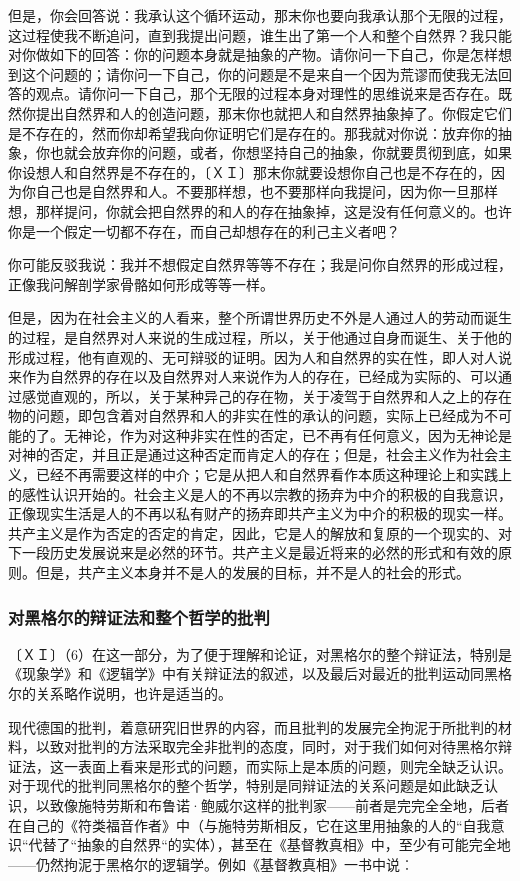 \documentclass[a4paper,twoside,12pt]{ctexart}
\begin{document}
但是，你会回答说：我承认这个循环运动，那末你也要向我承认那个无限的过程，这过程使我不断追问，直到我提出问题，谁生出了第一个人和整个自然界？我只能对你做如下的回答：你的问题本身就是抽象的产物。请你问一下自己，你是怎样想到这个问题的；请你问一下自己，你的问题是不是来自一个因为荒谬而使我无法回答的观点。请你问一下自己，那个无限的过程本身对理性的思维说来是否存在。既然你提出自然界和人的创造问题，那末你也就把人和自然界抽象掉了。你假定它们是不存在的，然而你却希望我向你证明它们是存在的。那我就对你说：放弃你的抽象，你也就会放弃你的问题，或者，你想坚持自己的抽象，你就要贯彻到底，如果你设想人和自然界是不存在的，〔ＸＩ〕那末你就要设想你自己也是不存在的，因为你自己也是自然界和人。不要那样想，也不要那样向我提问，因为你一旦那样想，那样提问，你就会把自然界的和人的存在抽象掉，这是没有任何意义的。也许你是一个假定一切都不存在，而自己却想存在的利己主义者吧？

你可能反驳我说：我并不想假定自然界等等不存在；我是问你自然界的形成过程，正像我问解剖学家骨骼如何形成等等一样。

但是，因为在社会主义的人看来，整个所谓世界历史不外是人通过人的劳动而诞生的过程，是自然界对人来说的生成过程，所以，关于他通过自身而诞生、关于他的形成过程，他有直观的、无可辩驳的证明。因为人和自然界的实在性，即人对人说来作为自然界的存在以及自然界对人来说作为人的存在，已经成为实际的、可以通过感觉直观的，所以，关于某种异己的存在物，关于凌驾于自然界和人之上的存在物的问题，即包含着对自然界和人的非实在性的承认的问题，实际上已经成为不可能的了。无神论，作为对这种非实在性的否定，已不再有任何意义，因为无神论是对神的否定，并且正是通过这种否定而肯定人的存在；但是，社会主义作为社会主义，已经不再需要这样的中介；它是从把人和自然界看作本质这种理论上和实践上的感性认识开始的。社会主义是人的不再以宗教的扬弃为中介的积极的自我意识，正像现实生活是人的不再以私有财产的扬弃即共产主义为中介的积极的现实一样。共产主义是作为否定的否定的肯定，因此，它是人的解放和复原的一个现实的、对下一段历史发展说来是必然的环节。共产主义是最近将来的必然的形式和有效的原则。但是，共产主义本身并不是人的发展的目标，并不是人的社会的形式。

\subsubsection{对黑格尔的辩证法和整个哲学的批判}
〔ＸＩ〕（6）在这一部分，为了便于理解和论证，对黑格尔的整个辩证法，特别是《现象学》和《逻辑学》中有关辩证法的叙述，以及最后对最近的批判运动同黑格尔的关系略作说明，也许是适当的。

现代德国的批判，着意研究旧世界的内容，而且批判的发展完全拘泥于所批判的材料，以致对批判的方法采取完全非批判的态度，同时，对于我们如何对待黑格尔辩证法，这一表面上看来是形式的问题，而实际上是本质的问题，则完全缺乏认识。对于现代的批判同黑格尔的整个哲学，特别是同辩证法的关系问题是如此缺乏认识，以致像施特劳斯和布鲁诺·鲍威尔这样的批判家——前者是完完全全地，后者在自己的《符类福音作者》中（与施特劳斯相反，它在这里用抽象的人的“自我意识“代替了“抽象的自然界“的实体），甚至在《基督教真相》中，至少有可能完全地——仍然拘泥于黑格尔的逻辑学。例如《基督教真相》一书中说︰
\end{document}

